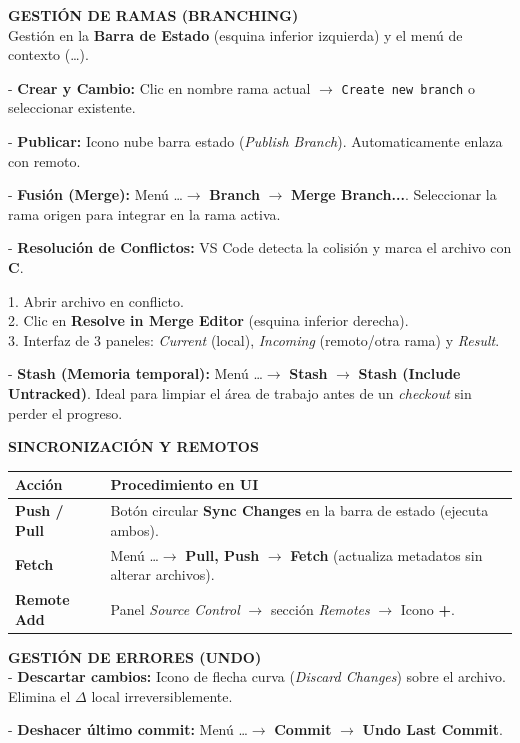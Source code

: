 \textbf{GESTIÓN DE RAMAS (BRANCHING)}\\
Gestión en la \textbf{Barra de Estado} (esquina inferior izquierda) y el menú de contexto (\dots).

- \textbf{Crear y Cambio:} Clic en nombre rama actual $\rightarrow$ \texttt{Create new branch} o seleccionar existente.

- \textbf{Publicar:} Icono nube barra estado (\textit{Publish Branch}). Automaticamente enlaza con remoto.

- \textbf{Fusión (Merge):} Menú \dots $\rightarrow$ \textbf{Branch} $\rightarrow$ \textbf{Merge Branch...}. Seleccionar la rama origen para integrar en la rama activa.

- \textbf{Resolución de Conflictos:} VS Code detecta la colisión y marca el archivo con \textbf{C}.

1. Abrir archivo en conflicto.\\
2. Clic en \textbf{Resolve in Merge Editor} (esquina inferior derecha).\\
3. Interfaz de 3 paneles: \textit{Current} (local), \textit{Incoming} (remoto/otra rama) y \textit{Result}.

- \textbf{Stash (Memoria temporal):} Menú \dots $\rightarrow$ \textbf{Stash} $\rightarrow$ \textbf{Stash (Include Untracked)}. Ideal para limpiar el área de trabajo antes de un \textit{checkout} sin perder el progreso.

\textbf{SINCRONIZACIÓN Y REMOTOS}
\begin{tabular}{lp{10cm}}
    \toprule
    \textbf{Acción} & \textbf{Procedimiento en UI} \\
    \midrule
    \textbf{Push / Pull} & Botón circular \textbf{Sync Changes} en la barra de estado (ejecuta ambos). \\
    \textbf{Fetch} & Menú \dots $\rightarrow$ \textbf{Pull, Push} $\rightarrow$ \textbf{Fetch} (actualiza metadatos sin alterar archivos). \\
    \textbf{Remote Add} & Panel \textit{Source Control} $\rightarrow$ sección \textit{Remotes} $\rightarrow$ Icono \textbf{+}. \\
    \bottomrule
\end{tabular}

\textbf{GESTIÓN DE ERRORES (UNDO)}\\
- \textbf{Descartar cambios:} Icono de flecha curva (\textit{Discard Changes}) sobre el archivo. Elimina el $\Delta$ local irreversiblemente.

- \textbf{Deshacer último commit:} Menú \dots $\rightarrow$ \textbf{Commit} $\rightarrow$ \textbf{Undo Last Commit}.

